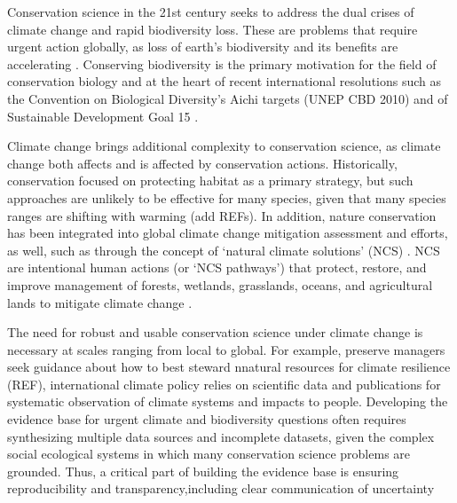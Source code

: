 \documentclass{article}
\begin{document}
\par Conservation science in the 21st century seeks to address the dual crises of  climate change and rapid biodiversity loss. These are problems that require urgent action globally, as loss of earth's biodiversity and its benefits are accelerating \citep{brondizio2019assessing, ripple2017extinction,tittensor2014mid}. Conserving biodiversity is the primary motivation for the field of conservation biology \citep{williams2020past} and at the heart of recent international resolutions such as the Convention on Biological Diversity's Aichi targets (UNEP CBD 2010) and of Sustainable Development Goal 15 \citep{assembly2015resolution}. 
\par Climate change brings additional complexity to conservation science, as climate change both affects and is affected by conservation actions. Historically, conservation focused on protecting habitat as a primary strategy, but such approaches are unlikely to be effective for many species, given that many species ranges are shifting with warming (add REFs). In addition, nature conservation has been integrated into global climate change mitigation assessment and efforts, as well, such as through the concept of `natural climate solutions’ (NCS) \citep{Ellis2024}. NCS are intentional human actions (or `NCS pathways') that protect, restore, and improve management of forests, wetlands, grasslands, oceans, and agricultural lands to mitigate climate change \citep{griscom2017natural}.

\par The need for robust and usable conservation science under climate change is necessary at scales ranging from local to global. For example, preserve managers seek guidance about how to best steward nnatural resources for climate resilience (REF), international climate policy relies on scientific data and publications for systematic observation of climate systems and impacts to people. Developing the evidence base for urgent climate and biodiversity questions often requires synthesizing multiple data sources and incomplete datasets, given the complex social ecological systems in which many conservation science problems are grounded. Thus, a critical part of building the evidence base is ensuring reproducibility and transparency,including clear communication of uncertainty \citep{Ellis2024,ipcc2007} 
\end{document}

